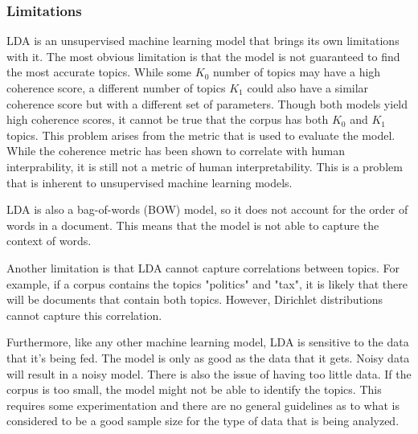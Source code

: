 \subsubsection{Limitations}

LDA is an unsupervised machine learning model that brings its own limitations with it. The most obvious limitation is that the model is not guaranteed to find the most accurate topics. While some $K_0$ number of topics may have a high coherence score, a different number of topics $K_1$ could also have a similar coherence score but with a different set of parameters. Though both models yield high coherence scores, it cannot be true that the corpus has both $K_0$ and $K_1$ topics. This problem arises from the metric that is used to evaluate the model. While the coherence metric has been shown to correlate with human interprability, it is still not a metric of human interpretability. This is a problem that is inherent to unsupervised machine learning models.

LDA is also a bag-of-words (BOW) model, so it does not account for the order of words in a document. This means that the model is not able to capture the context of words.

Another limitation is that LDA cannot capture correlations between topics. For example, if a corpus contains the topics "politics" and "tax", it is likely that there will be documents that contain both topics. However, Dirichlet distributions cannot capture this correlation.

Furthermore, like any other machine learning model, LDA is sensitive to the data that it's being fed. The model is only as good as the data that it gets. Noisy data will result in a noisy model. There is also the issue of having too little data. If the corpus is too small, the model might not be able to identify the topics. This requires some experimentation and there are no general guidelines as to what is considered to be a good sample size for the type of data that is being analyzed.